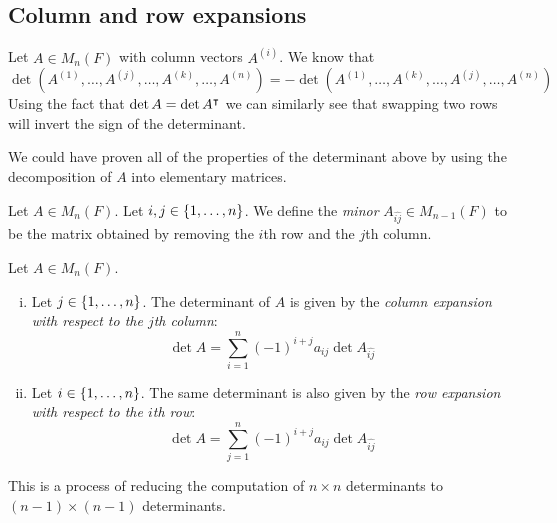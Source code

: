 \subsection{Column and row expansions}
Let \( A \in M_n(F) \) with column vectors \( A^{(i)} \).
We know that
\[
	\det(A^{(1)}, \dots, A^{(j)}, \dots, A^{(k)}, \dots, A^{(n)}) = -\det(A^{(1)}, \dots, A^{(k)}, \dots, A^{(j)}, \dots, A^{(n)})
\]
Using the fact that \( \det A = \det A^\intercal \) we can similarly see that swapping two rows will invert the sign of the determinant.
\begin{remark}
	We could have proven all of the properties of the determinant above by using the decomposition of \( A \) into elementary matrices.
\end{remark}
\begin{definition}
	Let \( A \in M_n(F) \).
	Let \( i, j \in \qty{1, \dots, n} \).
	We define the \textit{minor} \( A_{\widehat{ij}} \in M_{n-1}(F) \) to be the matrix obtained by removing the \( i \)th row and the \( j \)th column.
\end{definition}
\begin{lemma}
	Let \( A \in M_n(F) \).
	\begin{enumerate}[(i)]
		\item Let \( j \in \qty{1, \dots, n} \).
		      The determinant of \( A \) is given by the \textit{column expansion with respect to the \( j \)th column}:
		      \[
			      \det A = \sum_{i=1}^n (-1)^{i+j} a_{ij} \det A_{\widehat{ij}}
		      \]
		\item Let \( i \in \qty{1, \dots, n} \).
		      The same determinant is also given by the \textit{row expansion with respect to the \( i \)th row}:
		      \[
			      \det A = \sum_{j=1}^n (-1)^{i+j} a_{ij} \det A_{\widehat{ij}}
		      \]
	\end{enumerate}
	This is a process of reducing the computation of \( n \times n \) determinants to \( (n-1) \times (n-1) \) determinants.
\end{lemma}
